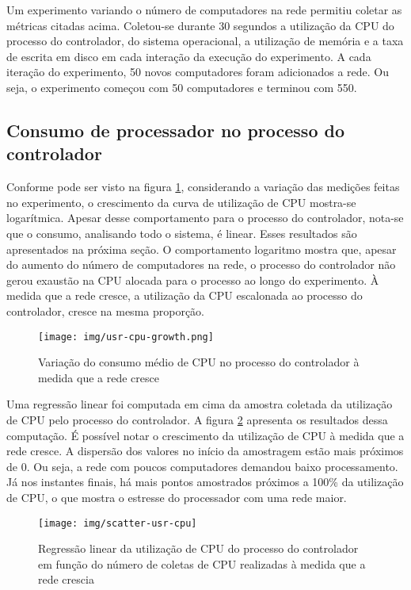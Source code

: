 Um experimento variando o número de computadores na rede permitiu coletar 
as métricas citadas acima.
Coletou-se durante 30 segundos a utilização da CPU do processo do controlador,
do sistema operacional, a utilização de memória e a taxa de escrita em disco
em cada interação da execução do experimento.
A cada iteração do experimento, 50 novos computadores foram adicionados a rede.
Ou seja, o experimento começou com 50 computadores e terminou com 550.

\subsection{Consumo de processador no processo do controlador}


Conforme pode ser visto na figura \ref{fig:usr-cpu-growth}, considerando a 
variação das medições feitas no experimento, o crescimento da curva de 
utilização de CPU mostra-se logarítmica.
Apesar desse comportamento para o processo do controlador, nota-se que o 
consumo, analisando todo o sistema, é linear.
Esses resultados são apresentados na próxima seção. 
O comportamento logaritmo mostra que, apesar do aumento do número de
computadores na rede, o processo do controlador não gerou exaustão na CPU 
alocada para o processo ao longo do experimento.
À medida que a rede cresce, a utilização da CPU escalonada ao processo do 
controlador, cresce na mesma proporção.

\begin{figure}[htb!]
    \centering
    \label{fig:usr-cpu-growth}
    \texttt{[image: img/usr-cpu-growth.png]}
    \caption{Variação do consumo médio de CPU no processo do controlador à 
    medida que a rede cresce}
\end{figure}

Uma regressão linear foi computada em cima da amostra coletada da utilização 
de CPU pelo processo do controlador.
A figura \ref{fig:scatter-usr-cpu} apresenta os resultados dessa computação.
É possível notar o crescimento da utilização de CPU à medida que a rede cresce.
A dispersão dos valores no início da amostragem estão mais próximos de 0. 
Ou seja, a rede com poucos computadores demandou baixo processamento. 
Já nos instantes finais, há mais pontos amostrados próximos a 100\% da 
utilização de CPU, o que mostra o estresse do processador com uma rede maior.

\begin{figure}[!htb]
    \centering
    \label{fig:scatter-usr-cpu}
    \texttt{[image: img/scatter-usr-cpu]}
    \caption{Regressão linear da utilização de CPU do processo do controlador
    em função do número de coletas de CPU realizadas à medida que a rede 
    crescia}
\end{figure}

